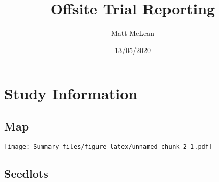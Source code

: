 \documentclass[
]{article}
\title{Offsite Trial Reporting}
\author{Matt McLean}
\date{13/05/2020}
\begin{document}
\maketitle

{
\setcounter{tocdepth}{4}
\tableofcontents
}
\hypertarget{study-information}{%
\section{Study Information}\label{study-information}}

\hypertarget{map}{%
\subsection{Map}\label{map}}

\texttt{[image: Summary\_files/figure-latex/unnamed-chunk-2-1.pdf]}

\hypertarget{seedlots}{%
\subsection{Seedlots}\label{seedlots}}
\end{document}

